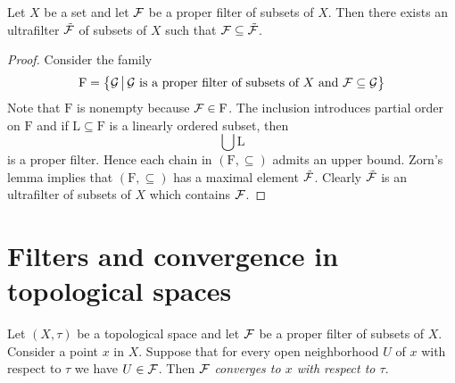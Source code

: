 \begin{proposition}\label{proposition:existence_of_ultrafilters}
Let $X$ be a set and let ${\mathcal F}$ be a proper filter of subsets of $X$. Then there exists an ultrafilter $\tilde{{\mathcal F}}$ of subsets of $X$ such that ${\mathcal F} \subseteq \tilde{{\mathcal F}}$.
\end{proposition}
\begin{proof}
Consider the family
$$\mathrm{F} = \big\{{\mathcal G}\,\big|\,{\mathcal G}\mbox{ is a proper filter of subsets of }X\mbox{ and }{\mathcal F} \subseteq {\mathcal G}\big\}$$
Note that $\mathrm{F}$ is nonempty because ${\mathcal F} \in \mathrm{F}$. The inclusion introduces partial order on $\mathrm{F}$ and if $\mathrm{L}\subseteq \mathrm{F}$ is a linearly ordered subset, then
$$\bigcup \mathrm{L}$$
is a proper filter. Hence each chain in $\left(\mathrm{F},\subseteq\right)$ admits an upper bound. Zorn's lemma implies that $\left(\mathrm{F},\subseteq\right)$ has a maximal element $\tilde{{\mathcal F}}$. Clearly $\tilde{{\mathcal F}}$ is an ultrafilter of subsets of $X$ which contains ${\mathcal F}$.
\end{proof}

\section{Filters and convergence in topological spaces}

\begin{definition}
Let $(X,\tau)$ be a topological space and let ${\mathcal F}$ be a proper filter of subsets of $X$. Consider a point $x$ in $X$. Suppose that for every open neighborhood $U$ of $x$ with respect to $\tau$ we have $U \in {\mathcal F}$. Then ${\mathcal F}$ \textit{converges to $x$ with respect to $\tau$}.
\end{definition}

